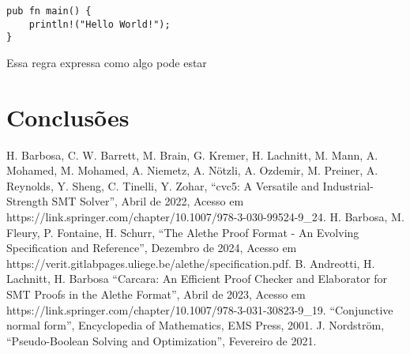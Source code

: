 \documentclass[conference]{IEEEtran}
\begin{document}
\begin{verbatim}
pub fn main() {
    println!("Hello World!");
}
\end{verbatim}

Essa regra expressa como algo pode estar



\section*{Conclusões}

\begin{thebibliography}{00}
              H. Barbosa, C. W. Barrett, M. Brain, G. Kremer, H. Lachnitt, M. Mann, A. Mohamed, M. Mohamed, A. Niemetz, A. Nötzli, A. Ozdemir, M. Preiner, A. Reynolds, Y. Sheng, C. Tinelli, Y. Zohar, ``cvc5: A Versatile and Industrial-Strength SMT Solver'', Abril de 2022, Acesso em https://link.springer.com/chapter/10.1007/978-3-030-99524-9\_24.
            H. Barbosa, M. Fleury, P. Fontaine, H. Schurr, ``The Alethe Proof Format - An Evolving Specification and Reference'', Dezembro de 2024, Acesso em https://verit.gitlabpages.uliege.be/alethe/specification.pdf.
           B. Andreotti, H. Lachnitt, H. Barbosa ``Carcara: An Efficient Proof Checker and Elaborator for SMT Proofs in the Alethe Format'', Abril de 2023, Acesso em https://link.springer.com/chapter/10.1007/978-3-031-30823-9\_19.
               ``Conjunctive normal form'', Encyclopedia of Mathematics, EMS Press, 2001.
           J. Nordström, ``Pseudo-Boolean Solving and Optimization'', Fevereiro de 2021.
\end{thebibliography}
\end{document}
